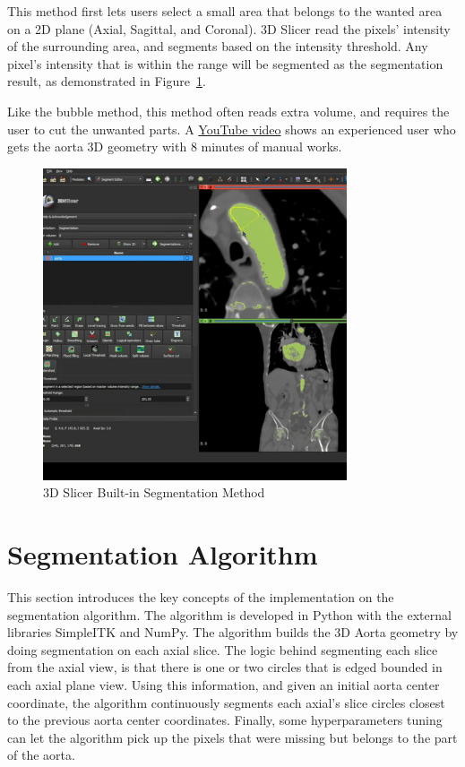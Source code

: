 This method first lets users select a small area that belongs to the wanted area on a 2D plane (Axial, Sagittal, and Coronal). 3D Slicer read the pixels' intensity of the surrounding area, and segments based on the intensity threshold. Any pixel's intensity that is within the range will be segmented as the segmentation result, as demonstrated in Figure~\ref{fig_3D_Seg_Builtin}. 

Like the bubble method, this method often reads extra volume, and requires the user to cut the unwanted parts. A \href{https://www.youtube.com/watch?v=5_673cHMBiY}{YouTube video} shows an experienced user who gets the aorta 3D geometry with 8 minutes of manual works. 

\begin{figure}[H]
    \centering
    \includegraphics[width=0.8\textwidth]{figures/Sample/3D-Slicer-Segmentation.png}
    \caption[3D Slicer Built-in Segmentation UI]{3D Slicer Built-in Segmentation Method \cite{Kikinis2014}}
    \label{fig_3D_Seg_Builtin}
\end{figure}

\section{Segmentation Algorithm}

This section introduces the key concepts of the implementation on the segmentation algorithm. The algorithm is developed in Python with the external libraries SimpleITK and NumPy. The algorithm builds the 3D Aorta geometry by doing segmentation on each axial slice. The logic behind segmenting each slice from the axial view, is that there is one or two circles that is edged bounded in each axial plane view. Using this information, and given an initial aorta center coordinate, the algorithm continuously segments each axial's slice circles closest to the previous aorta center coordinates. Finally, some hyperparameters tuning can let the algorithm pick up the pixels that were missing but belongs to the part of the aorta.

